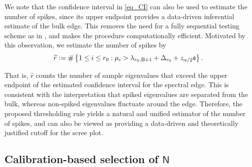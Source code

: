 \documentclass[12pt]{article}
\def\sN{\mathsf N}
\theoremstyle{plain}
\numberwithin{equation}{section}
\begin{document}
We note that the confidence interval in \eqref{eq_CI} can also be used to estimate the number of spikes, since its upper endpoint provides a data-driven inferential estimate of the bulk edge. This removes the need for a fully sequential testing scheme as in \citep{9779233,passemier2014estimation,onatski2009formal}, and makes the procedure computationally efficient. Motivated by this observation, we estimate the number of spikes by \vspace*{-10pt}
\begin{equation}\label{eq_estimator}
	\vspace*{-10pt}
	\widehat r
	:=
	\#\left\{
	1\le i\le r_0:
	\mu_i > \lambda_{r_0,\mathrm{B}+1}+\Delta_{r_0}
	+ z_{\alpha/2}\mathfrak{s}
	\right\}.
\end{equation}

That is, $\widehat r$ counts the number of sample eigenvalues that exceed the upper endpoint of the estimated confidence interval for the spectral edge. This is consistent with the interpretation that spiked eigenvalues are separated from the bulk, whereas non-spiked eigenvalues fluctuate around the edge. Therefore, the proposed thresholding rule yields a natural and unified estimator of the number of spikes, and can also be viewed as providing a data-driven and theoretically justified cutoff for the scree plot.


%

\subsection{Calibration-based selection of $\sN$}\label{sec_choiceofSN}
\end{document}
